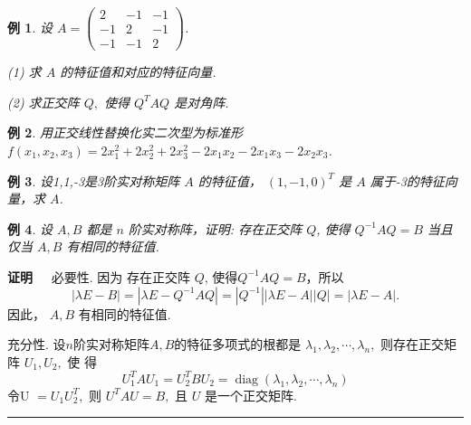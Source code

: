 \documentclass[13pt]{beamer}
\newtheorem{exa}{例}
\def\qed{\nopagebreak\hfill{\rule{4pt}{7pt}}\medbreak}
\def\pf{{\bf 证明~~ }}
\begin{document}
	\setcounter{exa}{0}

\begin{frame}
\begin{exa}
设 $A=\left(\begin{array}{ccc}2 & -1 & -1 \\ -1 & 2 & -1 \\ -1 & -1 & 2\end{array}\right)$.

(1) 求 $A$ 的特征值和对应的特征向量.

(2) 求正交阵 $Q,$ 使得 $Q^{T} A Q$ 是对角阵.
\end{exa}

\begin{exa}
 用正交线性替换化实二次型为标准形 $f\left(x_{1}, x_{2}, x_{3}\right)=2 x_{1}^{2}+2 x_{2}^{2}+2 x_{3}^{2}-2 x_{1} x_{2}-2 x_{1} x_{3}-2 x_{2} x_{3}$.
\end{exa}

\begin{exa}
	设1,1,-3是3阶实对称矩阵 $A$ 的特征值，  $(1,-1,0)^{T}$ 是 $A$ 属于-3的特征向量，求 $A$.
\end{exa}
\end{frame}


\begin{frame}



\begin{exa}
设 $A, B$ 都是 $n$ 阶实对称阵，证明: 存在正交阵 $Q$, 使得 $Q^{-1} A Q=B$ 当且仅当 $A, B$ 有相同的特征值.
\end{exa}

\pf 必要性. 因为 存在正交阵 $Q$, 使得$Q^{-1} A Q=B$，所以$$|\lambda E-B| = |\lambda E-Q^{-1} A Q|= |Q^{-1}| |\lambda E- A | |Q|  = |\lambda E- A |.$$
因此， $A, B$ 有相同的特征值.

充分性.
 设$n$阶实对称矩阵$A, B$的特征多项式的根都是 $\lambda_{1}, \lambda_{2}, \cdots, \lambda_{n},$ 则存在正交矩阵 $U_{1}, U_{2},$ 使
得
\[
U_{1}^{T} A U_{1}=U_{2}^{T} B U_{2}=\operatorname{diag}\left(\lambda_{1}, \lambda_{2}, \cdots, \lambda_{n}\right)
\]
令U $=U_{1} U_{2}^{T},$ 则 $U^{T} A U=B,$ 且 $U$ 是一个正交矩阵.
\qed
\end{frame}
\end{document}
